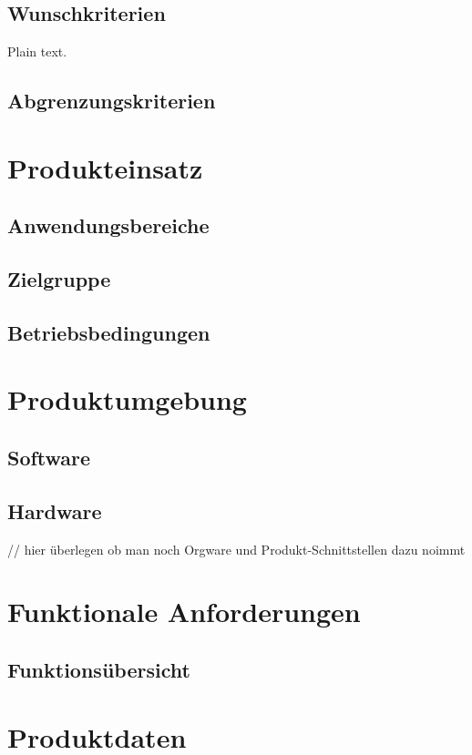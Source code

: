 \documentclass[parskip=full]{scrartcl}
\begin{document}
\subsection{Wunschkriterien}
Plain text.

\subsection{Abgrenzungskriterien}

\section{Produkteinsatz}

\subsection{Anwendungsbereiche}

\subsection{Zielgruppe}

\subsection{Betriebsbedingungen}

\section{Produktumgebung}

\subsection{Software}

\subsection{Hardware}
// hier überlegen ob man noch Orgware und Produkt-Schnittstellen dazu noimmt
\section{Funktionale Anforderungen}

\subsection{Funktionsübersicht}

\section{Produktdaten}
\end{document}
